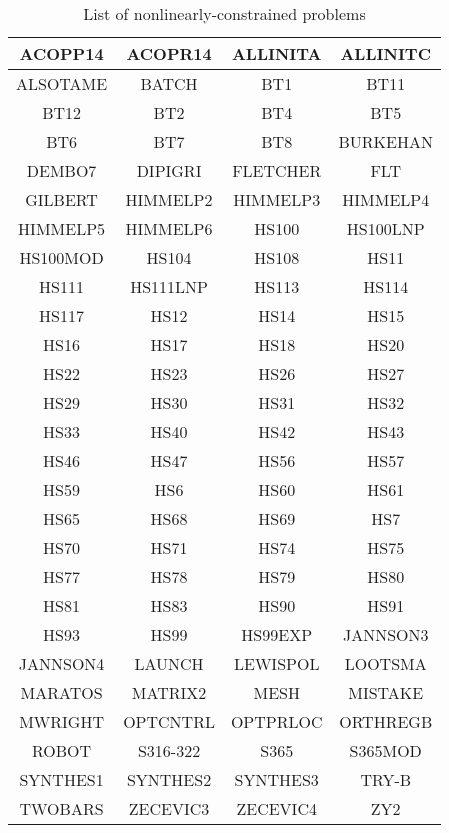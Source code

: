 \begin{longtable}{cccc}
    \caption{List of nonlinearly-constrained problems}\\
    \toprule
    ACOPP14     & ACOPR14   & ALLINITA  & ALLINITC\\
    \midrule
    ALSOTAME    & BATCH     & BT1       & BT11\\
    \midrule
    BT12        & BT2       & BT4       & BT5\\
    \midrule
    BT6         & BT7       & BT8       & BURKEHAN\\
    \midrule
    DEMBO7      & DIPIGRI   & FLETCHER  & FLT\\
    \midrule
    GILBERT     & HIMMELP2  & HIMMELP3  & HIMMELP4\\
    \midrule
    HIMMELP5    & HIMMELP6  & HS100     & HS100LNP\\
    \midrule
    HS100MOD    & HS104     & HS108     & HS11\\
    \midrule
    HS111       & HS111LNP  & HS113     & HS114\\
    \midrule
    HS117       & HS12      & HS14      & HS15\\
    \midrule
    HS16        & HS17      & HS18      & HS20\\
    \midrule
    HS22        & HS23      & HS26      & HS27\\
    \midrule
    HS29        & HS30      & HS31      & HS32\\
    \midrule
    HS33        & HS40      & HS42      & HS43\\
    \midrule
    HS46        & HS47      & HS56      & HS57\\
    \midrule
    HS59        & HS6       & HS60      & HS61\\
    \midrule
    HS65        & HS68      & HS69      & HS7\\
    \midrule
    HS70        & HS71      & HS74      & HS75\\
    \midrule
    HS77        & HS78      & HS79      & HS80\\
    \midrule
    HS81        & HS83      & HS90      & HS91\\
    \midrule
    HS93        & HS99      & HS99EXP   & JANNSON3\\
    \midrule
    JANNSON4    & LAUNCH    & LEWISPOL  & LOOTSMA\\
    \midrule
    MARATOS     & MATRIX2   & MESH      & MISTAKE\\
    \midrule
    MWRIGHT     & OPTCNTRL  & OPTPRLOC  & ORTHREGB\\
    \midrule
    ROBOT       & S316-322  & S365      & S365MOD\\
    \midrule
    SYNTHES1    & SYNTHES2  & SYNTHES3  & TRY-B\\
    \midrule
    TWOBARS     & ZECEVIC3  & ZECEVIC4  & ZY2\\
    \bottomrule
\end{longtable}
